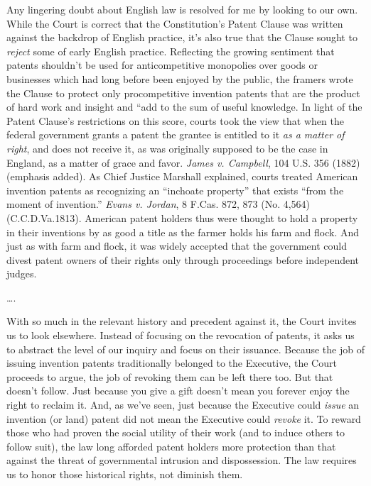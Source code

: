 Any lingering doubt about English law is resolved for me by looking to our own.
While the Court is correct that the Constitution's Patent Clause was written
against the backdrop of English practice,
it's also true that the Clause sought to \textit{reject}
some of early English practice. Reflecting the growing sentiment that patents
shouldn't be used for anticompetitive monopolies over goods or businesses
which had long before been enjoyed by the public, the framers wrote the Clause
to protect only procompetitive invention patents that are the product of hard
work and insight and ``add to the sum of useful knowledge.
In light of the Patent Clause's restrictions on this score, courts
took the view that when the federal government grants a patent
the grantee is entitled to it \textit{as a matter of right}, and does not
receive it, as was originally supposed to be the case in England, as a matter of
grace and favor. \textit{James v. Campbell}, 104 U.S. 356
(1882) (emphasis added). As Chief Justice Marshall explained, courts treated
American invention patents as recognizing an ``inchoate property'' that exists
``from the moment of invention.'' \textit{Evans v. Jordan}, 8 F.Cas. 872, 873
(No. 4,564) (C.C.D.Va.1813). American patent holders thus were thought to
hold a property in their inventions by as good a title as the farmer
holds his farm and flock.
And just as with farm and flock, it was
widely accepted that the government could divest patent owners of their rights
only through proceedings before independent judges.

\ldots.

With so much in the relevant history and precedent against it, the Court invites
us to look elsewhere. Instead of focusing on the revocation of patents, it asks
us to abstract the level of our inquiry and focus on their issuance. Because the
job of issuing invention patents traditionally belonged to the Executive, the
Court proceeds to argue, the job of revoking them can be left there too.
But that doesn't follow. Just because you give a
gift doesn't mean you forever enjoy the right to reclaim it. And, as we've seen,
just because the Executive could \textit{issue} an invention (or land) patent
did not mean the Executive could \textit{revoke} it. To reward those who had
proven the social utility of their work (and to induce others to follow suit),
the law long afforded patent holders more protection than that against the
threat of governmental intrusion and dispossession. The law requires us to honor
those historical rights, not diminish them.

